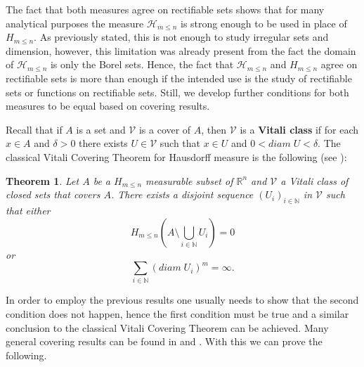 \documentclass[%
 aip,
 amsmath,amssymb,
 reprint,%
jmp]{revtex4-2}
\newtheorem{theorem}{Theorem}[section]
\begin{document}
The fact that both measures agree on rectifiable sets shows that for many analytical purposes the measure $\mathcal{H}_{m\leq n}$ is strong enough to be used in place of $H_{m\leq n}$. As previously stated, this is not enough to study irregular sets and dimension, however, this limitation was already present from the fact the domain of $\mathcal{H}_{m\leq n}$ is only the Borel sets. Hence, the fact that $\mathcal{H}_{m\leq n}$ and $H_{m\leq n}$ agree on rectifiable sets is more than enough if the intended use is the study of rectifiable sets or functions on rectifiable sets. Still, we develop further conditions for both measures to be equal based on covering results. 

Recall that if $A$ is a set and $\mathcal{V}$ is a cover of $A$, then $\mathcal{V}$ is a \textbf{Vitali class} if for each $x\in A$ and $\delta > 0$ there exists $U\in\mathcal{V}$ such that $x\in U$ and $0 < diam\;U < \delta$. The classical Vitali Covering Theorem for Hausdorff measure is the following (see \cite{Falconer}):

\begin{theorem}
Let $A$ be a $H_{m\leq n}$ measurable subset of $\mathbb{R}^{n}$ and $\mathcal{V}$ a Vitali class of closed sets that covers $A$. There exists a disjoint sequence $(U_{i})_{i\in\mathbb{N}}$ in $\mathcal{V}$ such that either
\begin{equation*}
    H_{m\leq n}\left(A\setminus\bigcup_{i\in\mathbb{N}}U_{i}\right) = 0
\end{equation*}
or
\begin{equation*}
    \sum_{i\in\mathbb{N}}(diam\;U_{i})^{m} = \infty.
\end{equation*}
\end{theorem}

In order to employ the previous results one usually needs to show that the second condition does not happen, hence the first condition must be true and a similar conclusion to the classical Vitali Covering Theorem can be achieved. Many general covering results can be found in \cite{Guzman1} and \cite{Guzman2}. With this we can prove the following.
\end{document}
